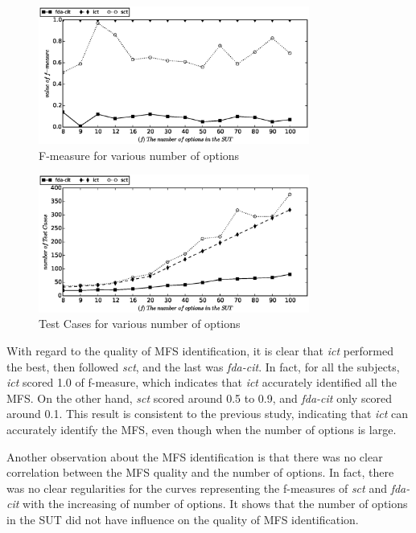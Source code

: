 \documentclass[10pt,journal,compsoc]{IEEEtran}
\begin{document}
\begin{figure}[htbp]
 \includegraphics[width=3.5in]{sens_options_f_measure.eps}
\caption{F-measure for various number of options}
\label{sen_opts_f_measure_result}
\end{figure}


\begin{figure}[htbp]
 \includegraphics[width=3.5in]{sens_options_tests.eps}
\caption{Test Cases for various number of options}
\label{sen_opts_tests_result}
\end{figure}

With regard to the quality of MFS identification, it is clear that \emph{ict} performed the best, then followed \emph{sct}, and the last was \emph{fda-cit}. In fact, for all the subjects, \emph{ict} scored 1.0 of f-measure, which indicates that \emph{ict} accurately identified all the MFS. On the other hand, \emph{sct} scored around 0.5 to 0.9, and \emph{fda-cit} only scored around 0.1.  This result is consistent to the previous study, indicating that \emph{ict} can accurately identify the MFS, even though when the number of options is large.

Another observation about the MFS identification is that there was no clear correlation between the MFS quality and the number of options. In fact, there was no clear regularities for the curves representing the f-measures of \emph{sct} and \emph{fda-cit} with the increasing of number of options. It shows that the number of options in the SUT did not have influence on the quality of MFS identification.
\end{document}

